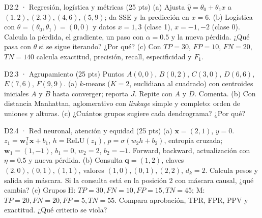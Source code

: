 \begin{ejercicio}{D2.2 · Regresión, logística y métricas (25 pts) }
(a)  Ajusta $\hat y=\theta_0+\theta_1x$ a $(1,2),(2,3),(4,6),(5,9)$; da SSE y la predicción en $x=6$.
(b)  Logística con $\theta=(\theta_0,\theta_1)=(0,0)$ y datos $x=1,3$ (clase 1), $x=-1,-2$ (clase 0). Calcula la pérdida, el gradiente,
un paso con $\alpha=0.5$ y la nueva pérdida. ¿Qué pasa con $\theta$ si se sigue iterando? ¿Por qué?
(c)  Con $TP=30$, $FP=10$, $FN=20$, $TN=140$ calcula exactitud, precisión, recall, especificidad y $F_1$.
\end{ejercicio}

\begin{ejercicio}{D2.3 · Agrupamiento (25 pts) }
Puntos $A(0,0)$, $B(0,2)$, $C(3,0)$, $D(6,6)$, $E(7,6)$, $F(9,9)$.
(a)  $k$-means ($K=2$, euclidiana al cuadrado) con centroides iniciales $A$ y $B$ hasta converger; reporta $J$. Repite con $A$ y $D$. Comenta.
(b)  Con distancia Manhattan, aglomerativo con \emph{linkage} simple y completo: orden de uniones y alturas.
(c)  ¿Cuántos grupos sugiere cada dendrograma? ¿Por qué?
\end{ejercicio}

\begin{ejercicio}{D2.4 · Red neuronal, atención y equidad (25 pts) }
(a)  $\mathbf x=(2,1)$, $y=0$. $z_1=\mathbf w_1^\mathsf T\mathbf x+b_1$, $h=\mathrm{ReLU}(z_1)$, $p=\sigma(w_2h+b_2)$, entropía cruzada;
$\mathbf w_1=(1,-1)$, $b_1=0$, $w_2=2$, $b_2=-1$. Forward, backward, actualización con $\eta=0.5$ y nueva pérdida.
(b)  Consulta $\mathbf q=(1,2)$, claves $(2,0),(0,1),(1,1)$, valores $(1,0),(0,1),(2,2)$, $d_k=2$. Calcula pesos y salida sin máscara.
Si la consulta está en la posición 2 con máscara causal, ¿qué cambia?
(c)  Grupos H: $TP=30,FN=10,FP=15,TN=45$; M: $TP=20,FN=20,FP=5,TN=55$. Compara aprobación, TPR, FPR, PPV y exactitud. ¿Qué criterio se viola?
\end{ejercicio}


